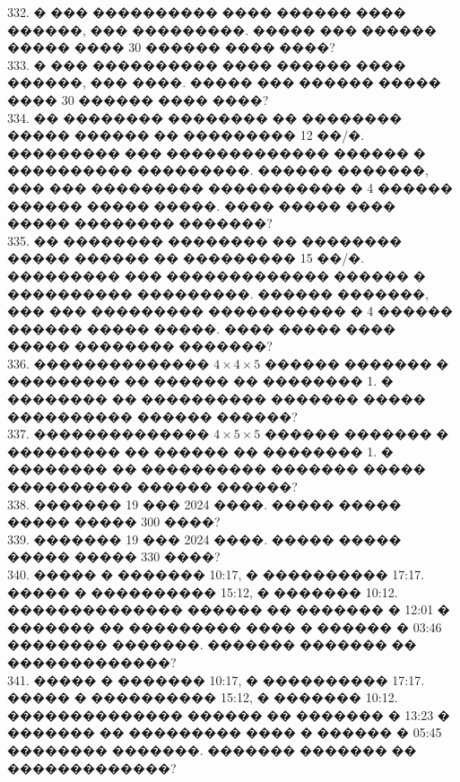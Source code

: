 \documentclass[12pt]{article}
\begin{document}
332. � ��� ���������� ���� ������ ���� ������, ��� ���������. ����� ��� ������ ����� ���� 30 ������ ���� ����?\\
333. � ��� ���������� ���� ������ ���� ������, ��� ����. ����� ��� ������ ����� ���� 30 ������ ���� ����?\\
334. �� �������� �������� �� �������� ����� ������ �� ��������� 12 ��/�. ��������� ��� ������������� ������ � ���������� ���������. ������ �������, ��� ��� ��������� ����������� � 4 ������ ������ ����� �����. ���� ����� ���� ����� �������� �������?\\
335. �� �������� �������� �� �������� ����� ������ �� ��������� 15 ��/�. ��������� ��� ������������� ������ � ���������� ���������. ������ �������, ��� ��� ��������� ����������� � 4 ������ ������ ����� �����. ���� ����� ���� ����� �������� �������?\\
336. �������������� $4\times4\times5$ ������ ������� � ��������� �� ������ �� �������� 1. � �������� �� ���������� ������� ����� ���������� ������ ������?\\
337. �������������� $4\times5\times5$ ������ ������� � ��������� �� ������ �� �������� 1. � �������� �� ���������� ������� ����� ���������� ������ ������?\\
338. ������� 19 ��� 2024 ����. ����� ����� ����� ����� 300 ����?\\
339. ������� 19 ��� 2024 ����. ����� ����� ����� ����� 330 ����?\\
340. ����� � ������� 10:17, � ���������� 17:17. ����� � ���������� 15:12, � ������� 10:12. �������������� ������ �� ������� � 12:01 � ������� �� ��������� ���� � ������ � 03:46 �������� �������. ������� ������� �� �������������?\\
341. ����� � ������� 10:17, � ���������� 17:17. ����� � ���������� 15:12, � ������� 10:12. �������������� ������ �� ������� � 13:23 � ������� �� ��������� ���� � ������ � 05:45 �������� �������. ������� ������� �� �������������?
\newpage
\end{document}
